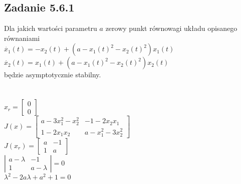 \subsection*{Zadanie 5.6.1} {\color{darkgray}
	Dla jakich wartości parametru $a$ zerowy punkt równowagi układu opisanego równaniami\\
	$\dot{x_1}(t)=-x_2(t)+(a-x_1(t)^2-x_2(t)^2)x_1(t)$\\
	$\dot{x_2}(t)=x_1(t)+(a-x_1(t)^2-x_2(t)^2)x_2(t)$\\
	będzie asymptotycznie stabilny.\\
}\lineh
\\\\
$x_r=\left[ \begin{array}{c}     0\\0   \end{array}\right]$\\
$J(x)=\left[ \begin{array}{cc}   a-3x_1^2-x_2^2 & -1-2x_2x_1 \\ 1-2x_1x_2 & a-x_1^2-3x_2^2    \end{array}\right]$\\
$J(x_r)=\left[ \begin{array}{cc}    a & -1 \\ 1 & a    \end{array}\right]$\\
$\left| \begin{array}{cc}     a-\lambda & -1 \\ 1 & a-\lambda   \end{array}\right|=0$\\
$\lambda^2-2a\lambda+a^2+1=0$\\
\\\\\\
